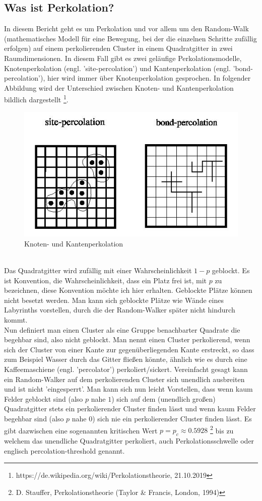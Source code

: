\documentclass[a4paper, 12pt]{scrartcl}
\begin{document}
\subsection{Was ist Perkolation?}
In diesem Bericht geht es um Perkolation und vor allem um den Random-Walk (mathematisches Modell für eine Bewegung, bei der die einzelnen Schritte zufällig erfolgen) auf einem perkolierenden Cluster in einem Quadratgitter in zwei Raumdimensionen. In diesem Fall gibt es zwei geläufige Perkolationsmodelle, Knotenperkolation (engl. 'site-percolation') und Kantenperkolation (engl. 'bond-percolation'), hier wird immer über Knotenperkolation gesprochen. In folgender Abbildung wird der Unterschied zwischen Knoten- und Kantenperkolation bildlich dargestellt \footnote{https://de.wikipedia.org/wiki/Perkolationstheorie, 21.10.2019}.
\begin{figure}[h!]
\centering
\includegraphics[scale=0.6]{Percolation1.jpg}
\caption{Knoten- und Kantenperkolation}
\end{figure}
\vspace{0,5cm}
\\
Das Quadratgitter wird zufällig mit einer Wahrscheinlichkeit $1-p$ geblockt. Es ist Konvention, die Wahrscheinlichkeit, dass ein Platz frei ist, mit $p$ zu bezeichnen, diese Konvention möchte ich hier erhalten. Geblockte Plätze können nicht besetzt werden. Man kann sich geblockte Plätze wie Wände eines Labyrinths vorstellen, durch die der Random-Walker später nicht hindurch kommt.  
\\
Nun definiert man einen Cluster als eine Gruppe benachbarter Quadrate die begehbar sind, also nicht geblockt. Man nennt einen Cluster perkolierend, wenn sich der Cluster von einer Kante zur gegenüberliegenden Kante erstreckt, so dass zum Beispiel Wasser durch das Gitter fließen könnte, ähnlich wie es durch eine Kaffeemaschiene (engl. 'percolator') perkoliert/sickert. Vereinfacht gesagt kann ein Random-Walker auf dem perkolierenden Cluster sich unendlich ausbreiten und ist nicht 'eingesperrt'. Man kann sich nun leicht Vorstellen, dass wenn kaum Felder geblockt sind (also $p$ nahe $1$) sich auf dem (unendlich großen) Quadratgitter stets ein perkolierender Cluster finden lässt und wenn kaum Felder begehbar sind (also $p$ nahe $0$) sich nie ein perkolierender Cluster finden lässt. Es gibt dazwischen eine sogenannten kritischen Wert $p=p_c \approx 0.5928$ \footnote{D. Stauffer, Perkolationstheorie (Taylor \& Francis, London, 1994)} bis zu welchem das unendliche Quadratgitter perkoliert, auch Perkolationsschwelle oder englisch percolation-threshold genannt.
\end{document}
